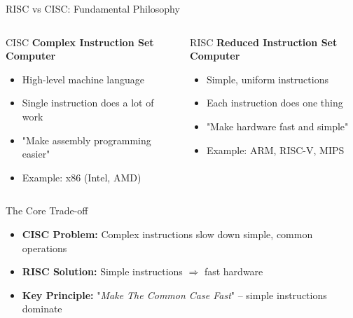 \documentclass[aspectratio=169,12pt]{beamer}
\begin{document}
\begin{frame}{RISC vs CISC: Fundamental Philosophy}
\begin{columns}[T]
\begin{block}{CISC}
\textbf{Complex Instruction Set Computer}
\begin{itemize}
    \item High-level machine language
    \item Single instruction does a lot of work
    \item "Make assembly programming easier"
    \item Example: x86 (Intel, AMD)
\end{itemize}
\end{block}


\begin{block}{RISC}
\textbf{Reduced Instruction Set Computer}
\begin{itemize}
    \item Simple, uniform instructions
    \item Each instruction does one thing
    \item "Make hardware fast and simple"
    \item Example: ARM, RISC-V, MIPS
\end{itemize}
\end{block}
\end{columns}

\vspace{0.5cm}
\begin{alertblock}{The Core Trade-off}
\begin{itemize}
    \item \textbf{CISC Problem:} Complex instructions slow down simple, common operations
    \item \textbf{RISC Solution:} Simple instructions $\Rightarrow$ fast hardware
    \item \textbf{Key Principle:} "\emph{Make The Common Case Fast}" -- simple instructions dominate
\end{itemize}
\end{alertblock}
\end{frame}
\end{document}
